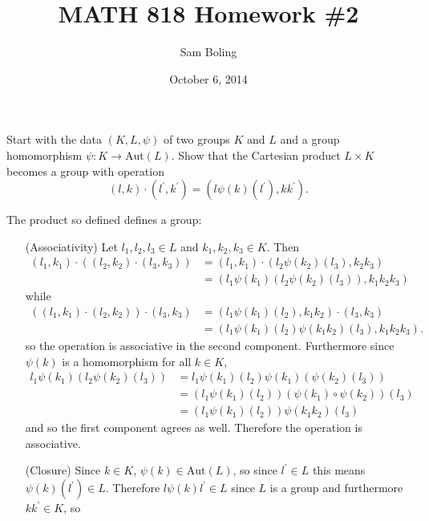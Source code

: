 \documentclass{article}
\title{MATH 818 Homework \#2}
\date{October 6, 2014}
\author{Sam Boling}
\newcounter{Problem}
\newenvironment{Problem}{\begin{Exercise}[name={Problem},
                                          counter={Problem}]}
                        {\end{Exercise}}
\begin{document}
\begin{titlepage}
\maketitle
\end{titlepage}

\begin{Problem}
Start with the data $(K, L, \psi)$ of two groups $K$ and $L$ and a
group homomorphism $\psi : K \to \mathrm{Aut}(L)$. Show that the
Cartesian product $L \times K$ becomes a group with operation
$$
(l, k) \cdot (l^\prime, k^\prime) = (l\psi(k)(l^\prime), k k^\prime).
$$
\end{Problem}

\begin{Answer}
The product so defined defines a group:
\begin{itemize}
  \item[(Associativity)]
    {Let $l_1, l_2, l_3 \in L$ and $k_1, k_2, k_3 \in K$. Then
     \begin{align*}
       (l_1, k_1) \cdot ((l_2, k_2) \cdot (l_3, k_3))
    &= (l_1, k_1) \cdot
       (l_2 \psi(k_2) (l_3), k_2 k_3) \\
    &= (l_1 \psi(k_1)(l_2 \psi(k_2) (l_3)), k_1 k_2 k_3)
    \end{align*}
    while
    \begin{align*}
      ((l_1, k_1) \cdot (l_2, k_2)) \cdot (l_3, k_3) 
   &= (l_1 \psi(k_1)(l_2), k_1 k_2) \cdot (l_3, k_3) \\
   &= (l_1 \psi(k_1)(l_2)
       \psi(k_1 k_2) (l_3), k_1 k_2 k_3).
    \end{align*}
    so the operation is associative in the second component.
    Furthermore since $\psi(k)$ is a homomorphism for all $k \in K$,
    \begin{align*}
     l_1 \psi(k_1)(l_2 \psi(k_2)(l_3))
  &= l_1 \psi(k_1)(l_2) \psi(k_1)(\psi(k_2)(l_3)) \\
  &= (l_1 \psi(k_1)(l_2))
      (\psi(k_1) \circ \psi(k_2))(l_3)\\
  &= (l_1 \psi(k_1)(l_2))
      \psi(k_1 k_2)(l_3)
     \end{align*}
     and so the first component agrees as well. Therefore the
     operation is associative.
    }
  \item[(Closure)]
    {
      Since $k \in K$, $\psi(k) \in \mathrm{Aut}(L)$, so
      since $l^\prime \in L$ this means $\psi(k)(l^\prime) \in
      L$. Therefore $l \psi(k) l^\prime \in L$ since $L$ is a group
      and furthermore $k k^\prime \in K$, so 
}
\end{itemize}
\end{Answer}
\end{document}
